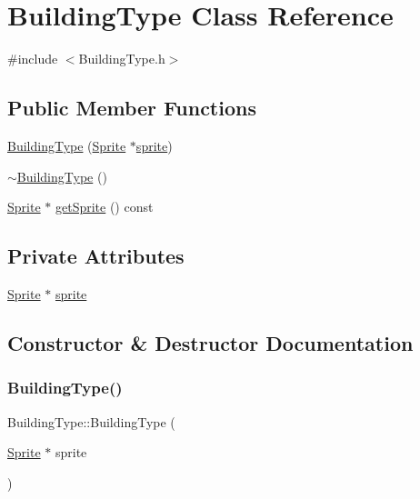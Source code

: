 \hypertarget{class_building_type}{}\section{Building\+Type Class Reference}
\label{class_building_type}


{\ttfamily \#include $<$Building\+Type.\+h$>$}

\subsection*{Public Member Functions}
\begin{DoxyCompactItemize}
\item 
\hyperlink{class_building_type_adc1276b1e62e04a1c6ea914b6d2d19b9}{Building\+Type} (\hyperlink{class_sprite}{Sprite} $\ast$\hyperlink{class_building_type_a478ebad17c32cae3c5def69b87b7d898}{sprite})
\item 
\hyperlink{class_building_type_ab307f939c2dfa1ec9732e369932aa601}{$\sim$\+Building\+Type} ()
\item 
\hyperlink{class_sprite}{Sprite} $\ast$ \hyperlink{class_building_type_a1e5e9337b34369ea7ccb9bfded67f7a1}{get\+Sprite} () const
\end{DoxyCompactItemize}
\subsection*{Private Attributes}
\begin{DoxyCompactItemize}
\item 
\hyperlink{class_sprite}{Sprite} $\ast$ \hyperlink{class_building_type_a478ebad17c32cae3c5def69b87b7d898}{sprite}
\end{DoxyCompactItemize}


\subsection{Constructor \& Destructor Documentation}
\mbox{\label{class_building_type_adc1276b1e62e04a1c6ea914b6d2d19b9}} 
\subsubsection{\texorpdfstring{Building\+Type()}{BuildingType()}}
{\footnotesize\ttfamily Building\+Type\+::\+Building\+Type (\begin{DoxyParamCaption}\item[{\hyperlink{class_sprite}{Sprite} $\ast$}]{sprite }\end{DoxyParamCaption})}

